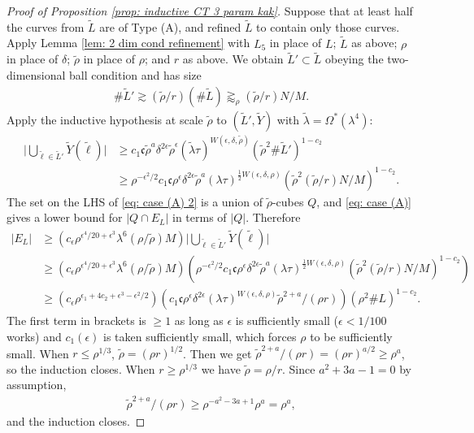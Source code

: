 \documentclass[12pt]{amsart}
\numberwithin{equation}{section}
\newcommand{\1}{\mathbbm{1}}
\begin{document}
\begin{proof}[Proof of Proposition \ref{prop: inductive CT 3 param kak}]
    Suppose that at least half the curves from $\tilde L$ are of Type (A), and refined $\tilde L$ to contain only those curves. Apply Lemma \ref{lem: 2 dim cond refinement} with $L_5$ in place of $L$; $\tilde L$ as above; $\rho$ in place of $\delta$; $\tilde \rho$ in place of $\rho$; and $r$ as above. We obtain $\tilde L' \subset \tilde L$ obeying the two-dimensional ball condition and has size
    \begin{align}
        \# \tilde L' \gtrsim (\tilde \rho / r) (\# \tilde L) \gtrapprox_\rho (\tilde \rho / r) N/M. 
    \end{align}
    Apply the inductive hypothesis at scale $\tilde \rho$ to $(\tilde L', \tilde Y)$ with $\tilde \lambda = \Omega^*(\lambda^4)$:
    \begin{align} \label{eq: case (A) 2}
        \Big |\bigcup_{\tilde \ell \in \tilde L'} \tilde Y(\tilde \ell)\Big | &\geq c_1 \mathfrak c\tilde \rho^a \delta^{2\epsilon} \tilde \rho^\epsilon (\tilde \lambda \tau)^{W(\epsilon, \delta, \tilde \rho )}(\tilde \rho^2 \# \tilde L')^{1-c_2} \\
        &\geq \rho^{-\epsilon^2 / 2} c_1 \mathfrak c \rho^\epsilon \delta^{2\epsilon} \tilde \rho^a (\lambda\tau)^{\frac{1}{2} W(\epsilon, \delta, \rho)} (\tilde \rho^2 (\tilde \rho/ r) N / M)^{1- c_2}. 
    \end{align}
    The set on the LHS of 
    \eqref{eq: case (A) 2} is a union of $\tilde \rho$-cubes $Q$, and \eqref{eq: case (A)} gives a lower bound for $|Q \cap E_L|$ in terms of $|Q|$. Therefore 
    \begin{align}
        |E_L| &\geq (c_\epsilon \rho^{\epsilon^4 / 20 +\epsilon^3} \lambda^6 (\rho / \tilde \rho) M) \Big |\bigcup_{\tilde \ell \in \tilde L'} \tilde Y(\tilde \ell)\Big | \\
        &\geq (c_\epsilon \rho^{\epsilon^4 / 20 +\epsilon^3} \lambda^6 (\rho / \tilde \rho) M) (\rho^{-\epsilon^2 / 2} c_1 \mathfrak c \rho^\epsilon \delta^{2\epsilon} \tilde \rho^a (\lambda \tau)^{\frac{1}{2} W(\epsilon, \delta, \rho)} (\tilde \rho^2 (\tilde \rho/ r) N / M)^{1- c_2}) \\
        &\geq (c_\epsilon \rho^{\epsilon_1 + 4c_2 + \epsilon^3 - \epsilon^2 /2})(c_1 \mathfrak c \rho^\epsilon \delta^{2\epsilon} (\lambda \tau)^{W(\epsilon, \delta, \rho)} \tilde \rho^{2 + a}/(\rho r))(\rho^2 \# L)^{1-c_2}. 
    \end{align}
    The first term in brackets is $\geq 1$ as long as $\epsilon$ is sufficiently small ($\epsilon < 1/100$ works) and $c_1(\epsilon)$ is taken sufficiently small, which forces $\rho$ to be sufficiently small. 
    When $r \leq \rho^{1/3}$, $\tilde \rho = (\rho r)^{1/2}$. Then we get $\tilde \rho^{2 + a} / (\rho r) = (\rho r)^{a/2} \geq \rho^a$, so the induction closes. When $r \geq \rho^{1/3}$ we have $\tilde \rho = \rho / r$. Since $a^2 + 3a - 1 = 0$ by assumption, 
    \begin{align}
        \tilde \rho^{2 + a} / (\rho r) \geq \rho^{-a^2 - 3a + 1} \rho^a = \rho^a,
    \end{align}
    and the induction closes. 
    


\end{proof}
\end{document}
